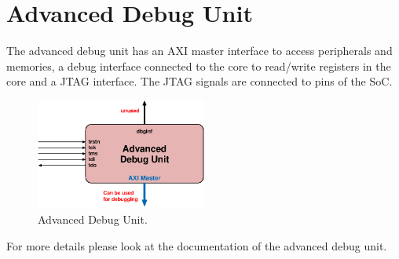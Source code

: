 \chapter{Advanced Debug Unit}

The advanced debug unit has an AXI master interface to access peripherals and
memories, a debug interface connected to the core to read/write registers in the
core and a JTAG interface.
The JTAG signals are connected to pins of the SoC.

\begin{figure}[H]
  \centering
  \includegraphics[width=0.5\textwidth]{./figures/adv_dbg_unit}
  \caption{Advanced Debug Unit.}
  \label{fig:adv_dbg_unit}
\end{figure}

For more details please look at the documentation of the advanced debug unit.

